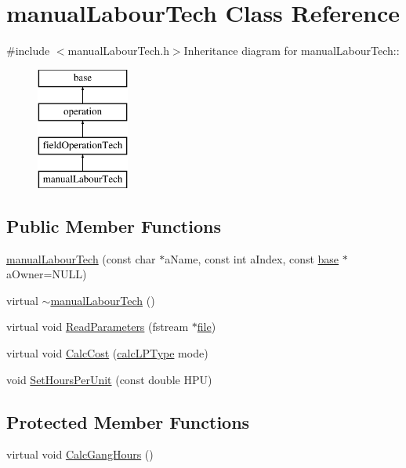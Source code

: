 \hypertarget{classmanual_labour_tech}{
\section{manualLabourTech Class Reference}
\label{classmanual_labour_tech}
}


{\ttfamily \#include $<$manualLabourTech.h$>$}Inheritance diagram for manualLabourTech::\begin{figure}[H]
\begin{center}
\leavevmode
\includegraphics[height=4cm]{classmanual_labour_tech}
\end{center}
\end{figure}
\subsection*{Public Member Functions}
\begin{DoxyCompactItemize}
\item 
\hyperlink{classmanual_labour_tech_a67af82062cb5809d5e9ad37de0b1f9f7}{manualLabourTech} (const char $\ast$aName, const int aIndex, const \hyperlink{classbase}{base} $\ast$aOwner=NULL)
\item 
virtual \hyperlink{classmanual_labour_tech_a7d961278e18de8feb427ab9df6734011}{$\sim$manualLabourTech} ()
\item 
virtual void \hyperlink{classmanual_labour_tech_a1b03a5bb1d552a3bacaeb5bb758a1e17}{ReadParameters} (fstream $\ast$\hyperlink{classbase_a3af52ee9891719d09b8b19b42450b6f6}{file})
\item 
virtual void \hyperlink{classmanual_labour_tech_a672922b49eac69b5ebf765e66bdcb3ef}{CalcCost} (\hyperlink{typer_8h_af05cf854fc14086a0d6404be5ae9813f}{calcLPType} mode)
\item 
void \hyperlink{classmanual_labour_tech_a9470bcb6a62316d2aa73286c436ebb19}{SetHoursPerUnit} (const double HPU)
\end{DoxyCompactItemize}
\subsection*{Protected Member Functions}
\begin{DoxyCompactItemize}
\item 
virtual void \hyperlink{classmanual_labour_tech_a4947c755580db30ddaf817a7f7238600}{CalcGangHours} ()
\end{DoxyCompactItemize}
